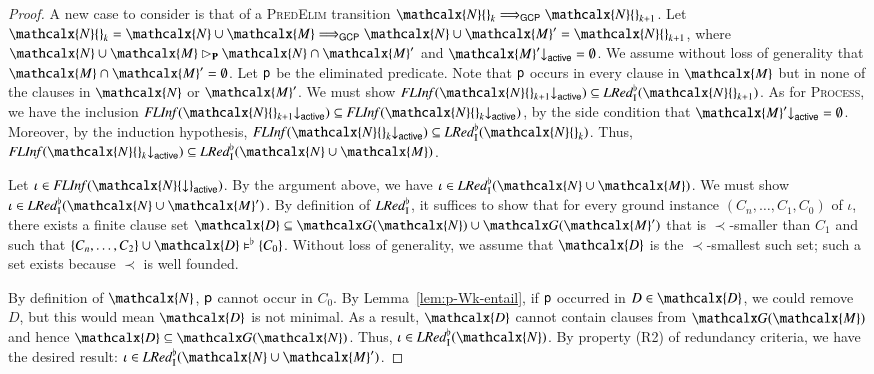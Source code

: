 \begin{rep}
\begin{proof}
\begin{sloppypar}
   A new case to consider is that of a \textsc{PredElim} transition
   $\mathcalx{N}{}_{k} \Longrightarrow_\mathsf{GCP} \mathcalx{N}{}_{k+1}$.
   Let $\mathcalx{N}{}_{k} = \mathcalx{N} \cup \mathcalx{M}
   \Longrightarrow_\mathsf{GCP} \mathcalx{N} \cup \mathcalx{M}' = \mathcalx{N}{}_{k+1}$,
   where $\mathcalx{N} \cup \mathcalx{M} \rhd_\mathbf{P}
   \mathcalx{N} \cap \mathcalx{M}'$ and
   $\mathcalx{M}'{\downarrow}_\mathsf{active} = \emptyset$.
   We assume without loss of generality that $\mathcalx{M} \cap \mathcalx{M}' =
   \emptyset$.
   Let $\mathsf{p}$ be the eliminated predicate. Note that $\mathsf{p}$ occurs in every
   clause in $\mathcalx{M}$ but in none of the clauses in $\mathcalx{N}$ or
   $\mathcalx{M}'$.
   We must show $\FLInf(\mathcalx{N}{}_{k+1} {\downarrow}_\mathsf{active})
   \subseteq \LRedIWk(\mathcalx{N}{}_{k+1})$.
   As for \textsc{Process}, we have the inclusion
   $\FLInf(\mathcalx{N}{}_{k+1} {\downarrow}_\mathsf{active})
   \subseteq \FLInf(\mathcalx{N}{}_k {\downarrow}_\mathsf{active})$,
   by the side condition that
   $\mathcalx{M}'{\downarrow}_\mathsf{active} = \emptyset$.
   Moreover, by the induction hypothesis,
   $\FLInf(\mathcalx{N}{}_k {\downarrow}_\mathsf{active})
   \subseteq \LRedIWk(\mathcalx{N}{}_k)$. Thus,
   $\FLInf(\mathcalx{N}{}_k {\downarrow}_\mathsf{active})
   \subseteq \LRedIWk(\mathcalx{N} \cup \mathcalx{M})$.
\end{sloppypar}

Let $\iota \in \FLInf(\mathcalx{N} {\downarrow}_\mathsf{active})$.
By the argument above, we have
$\iota \in \LRedIWk(\mathcalx{N} \cup \mathcalx{M})$.
We must
show $\iota \in \LRedIWk(\mathcalx{N} \cup \mathcalx{M}')$.
%
By definition of $\mathit{LRed}_\mathrm{I}^{\flat}$, it suffices to show that for
every ground instance $(C_n,\ldots,C_1,C_0)$ of $\iota$, there exists a finite
clause set $\mathcalx{D} \subseteq \gnd(\mathcalx{N}) \cup \gnd(\mathcalx{M}')$
that is $\prec$-smaller than $C_1$ and such that
$\{C_n,\ldots,C_2\} \cup \mathcalx{D} \modelsWk \{C_0\}$.
Without loss of generality, we assume that $\mathcalx{D}$ is the $\prec$-smallest such set; such a set exists because $\prec$ is well founded.

By definition of $\mathcalx{N}$, $\mathsf{p}$ cannot occur in $C_0$.
By Lemma~\ref{lem:p-Wk-entail}, if $\mathsf{p}$ occurred in $D \in \mathcalx{D}$,
we could remove $D$, but this would mean $\mathcalx{D}$ is not minimal.
As a result, $\mathcalx{D}$ cannot contain clauses from $\gnd(\mathcalx{M})$ and
hence $\mathcalx{D} \subseteq \gnd(\mathcalx{N})$. Thus,
$\iota \in \LRedIWk(\mathcalx{N})$. By property (R2) of
redundancy criteria, we have the desired result: $\iota \in
\LRedIWk(\mathcalx{N} \cup \mathcalx{M}')$.
\end{proof}


\end{rep}
